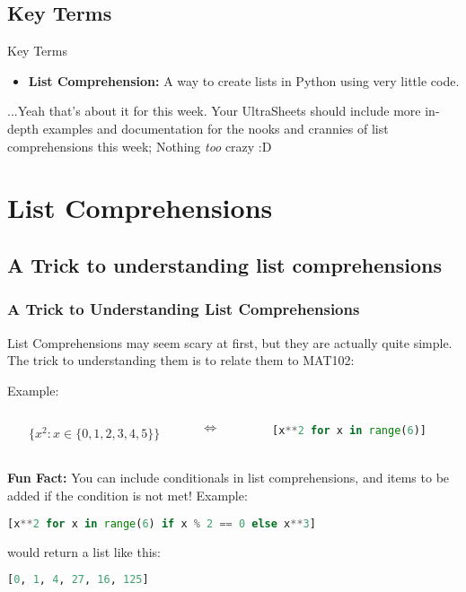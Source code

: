 \documentclass[hyperref={colorlinks,citecolor=blue,linkcolor=blue,urlcolor=blue}]{beamer}
\begin{document}
\subsection{Key Terms}
\begin{frame}{Key Terms}
  \begin{itemize}
    \item \textbf{List Comprehension:} A way to create lists in Python using very little code. 
    \end{itemize}
    ...Yeah that's about it for this week. Your UltraSheets\texttrademark{} should include more in-depth examples and documentation for the nooks and crannies of list comprehensions this week; Nothing \textit{too} crazy :D
\end{frame}

\section{List Comprehensions}

\subsection{A Trick to understanding list comprehensions}

\begin{frame}[fragile]
  \frametitle{A Trick to Understanding List Comprehensions}
    List Comprehensions may seem scary at first, but they are actually quite simple. The trick to understanding them is to relate them to MAT102:

  Example:
  
  \begin{columns}[T]
    \begin{column}{0.4\textwidth}
    \begin{align*}
        \{x^2 : x \in \{0, 1, 2, 3, 4, 5\}\}
    \end{align*}
    \end{column}
    \hfill
    \begin{column}{0.1\textwidth}
    \begin{center}
    \Large $\iff$
    \end{center}
    \end{column}
    \hfill
    \begin{column}{0.5\textwidth}
    \begin{lstlisting}[language=Python, style=mystyle]
[x**2 for x in range(6)]
    \end{lstlisting}
    \end{column}
    \end{columns}


    \textbf{Fun Fact:} You can include conditionals in list comprehensions, and items to be added if the condition is not met! Example:
    \begin{lstlisting}[language=Python, style=mystyle]
[x**2 for x in range(6) if x % 2 == 0 else x**3]
    \end{lstlisting}
    would return a list like this:
    \begin{lstlisting}[language=Python, style=mystyle]
[0, 1, 4, 27, 16, 125]
    \end{lstlisting}
\end{frame}
\end{document}
